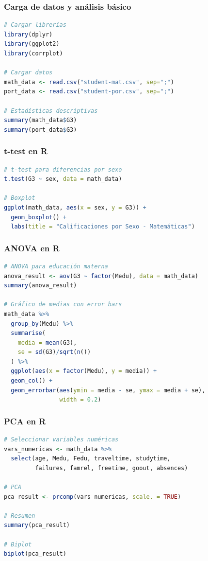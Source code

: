 \documentclass[a4paper,12pt]{article}
\begin{document}
\subsubsection{Carga de datos y análisis básico}
\begin{lstlisting}[language=R]
# Cargar librerías
library(dplyr)
library(ggplot2)
library(corrplot)

# Cargar datos
math_data <- read.csv("student-mat.csv", sep=";")
port_data <- read.csv("student-por.csv", sep=";")

# Estadísticas descriptivas
summary(math_data$G3)
summary(port_data$G3)
\end{lstlisting}

\subsubsection{t-test en R}
\begin{lstlisting}[language=R]
# t-test para diferencias por sexo
t.test(G3 ~ sex, data = math_data)

# Boxplot
ggplot(math_data, aes(x = sex, y = G3)) +
  geom_boxplot() +
  labs(title = "Calificaciones por Sexo - Matemáticas")
\end{lstlisting}

\subsubsection{ANOVA en R}
\begin{lstlisting}[language=R]
# ANOVA para educación materna
anova_result <- aov(G3 ~ factor(Medu), data = math_data)
summary(anova_result)

# Gráfico de medias con error bars
math_data %>%
  group_by(Medu) %>%
  summarise(
    media = mean(G3),
    se = sd(G3)/sqrt(n())
  ) %>%
  ggplot(aes(x = factor(Medu), y = media)) +
  geom_col() +
  geom_errorbar(aes(ymin = media - se, ymax = media + se),
                width = 0.2)
\end{lstlisting}

\subsubsection{PCA en R}
\begin{lstlisting}[language=R]
# Seleccionar variables numéricas
vars_numericas <- math_data %>%
  select(age, Medu, Fedu, traveltime, studytime, 
         failures, famrel, freetime, goout, absences)

# PCA
pca_result <- prcomp(vars_numericas, scale. = TRUE)

# Resumen
summary(pca_result)

# Biplot
biplot(pca_result)
\end{lstlisting}
\end{document}
